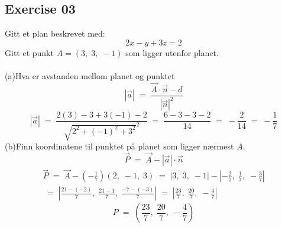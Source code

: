 \documentclass[12pt, a4paper]{article}
\begin{document}
\newpage\quad			
\subsection*{Exercise 03}
Gitt et plan beskrevet med:
	\begin{equation}
		\tag*{}
		2x-y+3z=2
	\end{equation}
Gitt et punkt $A=(3,\;3,\;-1)$ som ligger utenfor planet.\\\\
	(a)\quad Hva er avstanden mellom planet og punktet
			\begin{equation}
				\tag*{}
					|\vec{a}|\;=\;\frac{
					\vec{A}\cdot\vec{n}-d}
					{\left|\vec{n}\right|^2}
			\end{equation}
			\begin{equation}
				\tag*{}
					\left|\vec{a}\right|
					\;=\;\frac{2(3)-3+3(-1)-2}
					{\sqrt{2^2+(-1)^2+3^2}^2}\;=\;
					\frac{6-3-3-2}{14}\;=\;
					-\frac{2}{14}\;=\;-\frac{1}{7}
			\end{equation}
	(b)\quad Finn koordinatene til punktet på planet som
	ligger nærmest $A$.
			\begin{equation}
				\tag*{}
					\vec{P}\;=\;\vec{A}-|
					\vec{a}|\cdot\vec{n}
			\end{equation}
			\begin{gather}
				\tag*{}
					\vec{P}\;=\;\vec{A}-
					\left(-\frac{1}{7}\right)(2,\;-1,\;3)
					\;=\;|3,\;3,\;-1|-\left|
						-\frac{2}{7},\;
						\frac{1}{7},\;
						-\frac{3}{7}
					\right|\\
				\tag*{}
					\;=\;\left|
						\frac{21-(-2)}{7},\;
						\frac{21-1}{7},\;
						\frac{-7-(-3)}{7}
					\right|\;=\;\left|
						\frac{23}{7},\;
						\frac{20}{7},\;
						-\frac{4}{7}
					\right|
			\end{gather}
			\begin{equation}
					\tag*{}
						P\;=\;\left(
							\frac{23}{7},\;
							\frac{20}{7},\;
							-\frac{4}{7}
						\right)
			\end{equation}
\newpage\quad		
\end{document}

